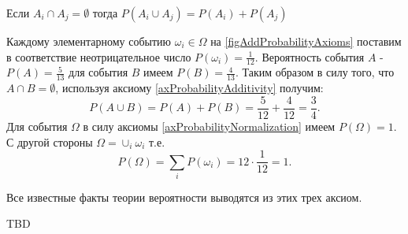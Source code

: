 \begin{axiom}[Аддитивность]
\label{axProbabilityAdditivity}
Если $A_i \cap A_j = \emptyset$ тогда 
$P\left(A_i \cup A_j\right) = P\left(A_i\right) + P\left(A_j\right)$
\end{axiom}

\begin{example}

Каждому элементарному событию $\omega_i \in \Omega$
на \autoref{figAddProbabilityAxioms} поставим в соответствие
неотрицательное число 
$P\left(\omega_i\right) = \frac{1}{12}$. Вероятность события $A$ - 
$P\left(A\right) = \frac{5}{13}$ для события $B$ имеем
$P\left(B\right) = \frac{4}{13}$. Таким образом в силу того, что 
$A \cap B = \emptyset$, используя аксиому
\ref{axProbabilityAdditivity} получим:
\[
P\left(A\cup B\right) = 
P\left(A\right) + P\left(B\right) = 
\frac{5}{12} + \frac{4}{12} = \frac{3}{4}.
\]
Для события $\Omega$ в силу аксиомы \ref{axProbabilityNormalization}
имеем $P\left(\Omega\right) = 1$. С другой стороны 
$\Omega = \cup_i \omega_i$ т.е. 
\[
P\left(\Omega\right) = \sum_i P\left(\omega_i\right) =
12\cdot\frac{1}{12} = 1.
\]
\end{example}


Все известные факты теории вероятности выводятся из этих трех аксиом.  



TBD
